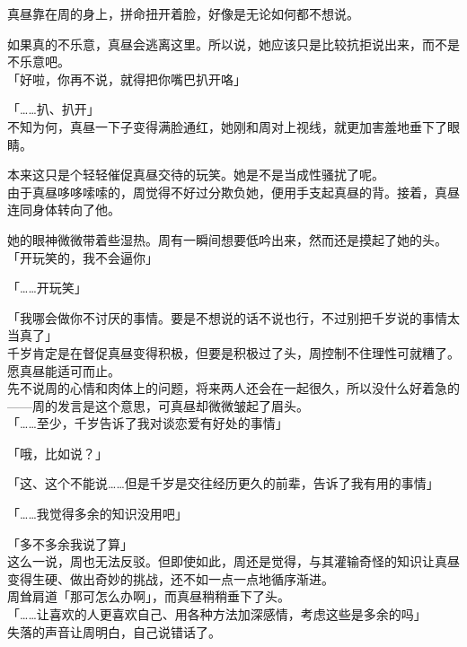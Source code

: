 真昼靠在周的身上，拼命扭开着脸，好像是无论如何都不想说。

如果真的不乐意，真昼会逃离这里。所以说，她应该只是比较抗拒说出来，而不是不乐意吧。\\

「好啦，你再不说，就得把你嘴巴扒开咯」

「……扒、扒开」\\

不知为何，真昼一下子变得满脸通红，她刚和周对上视线，就更加害羞地垂下了眼睛。

本来这只是个轻轻催促真昼交待的玩笑。她是不是当成性骚扰了呢。\\

由于真昼哆哆嗦嗦的，周觉得不好过分欺负她，便用手支起真昼的背。接着，真昼连同身体转向了他。

她的眼神微微带着些湿热。周有一瞬间想要低吟出来，然而还是摸起了她的头。\\

「开玩笑的，我不会逼你」

「……开玩笑」

「我哪会做你不讨厌的事情。要是不想说的话不说也行，不过别把千岁说的事情太当真了」\\

千岁肯定是在督促真昼变得积极，但要是积极过了头，周控制不住理性可就糟了。愿真昼能适可而止。\\

先不说周的心情和肉体上的问题，将来两人还会在一起很久，所以没什么好着急的——周的发言是这个意思，可真昼却微微皱起了眉头。\\

「……至少，千岁告诉了我对谈恋爱有好处的事情」

「哦，比如说？」

「这、这个不能说……但是千岁是交往经历更久的前辈，告诉了我有用的事情」

「……我觉得多余的知识没用吧」

「多不多余我说了算」\\

这么一说，周也无法反驳。但即使如此，周还是觉得，与其灌输奇怪的知识让真昼变得生硬、做出奇妙的挑战，还不如一点一点地循序渐进。\\

周耸肩道「那可怎么办啊」，而真昼稍稍垂下了头。\\

「……让喜欢的人更喜欢自己、用各种方法加深感情，考虑这些是多余的吗」\\

失落的声音让周明白，自己说错话了。\\

